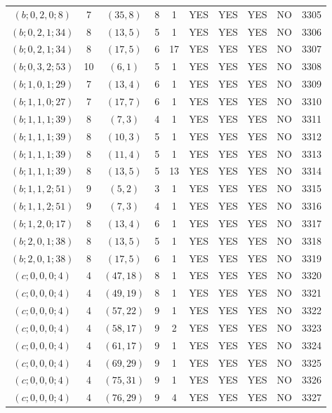 \begin{longtable}{|c|c|c|c|c|c|c|c|c|c|}
$(b; 0, 2, 0; 8)$ & 7 & $(35, 8)$ & 8 & 1 & YES & YES & YES & NO & 3305\\
$(b; 0, 2, 1; 34)$ & 8 & $(13, 5)$ & 5 & 1 & YES & YES & YES & NO & 3306\\
$(b; 0, 2, 1; 34)$ & 8 & $(17, 5)$ & 6 & 17 & YES & YES & YES & NO & 3307\\
$(b; 0, 3, 2; 53)$ & 10 & $(6, 1)$ & 5 & 1 & YES & YES & YES & NO & 3308\\
$(b; 1, 0, 1; 29)$ & 7 & $(13, 4)$ & 6 & 1 & YES & YES & YES & NO & 3309\\
$(b; 1, 1, 0; 27)$ & 7 & $(17, 7)$ & 6 & 1 & YES & YES & YES & NO & 3310\\
$(b; 1, 1, 1; 39)$ & 8 & $(7, 3)$ & 4 & 1 & YES & YES & YES & NO & 3311\\
$(b; 1, 1, 1; 39)$ & 8 & $(10, 3)$ & 5 & 1 & YES & YES & YES & NO & 3312\\
$(b; 1, 1, 1; 39)$ & 8 & $(11, 4)$ & 5 & 1 & YES & YES & YES & NO & 3313\\
$(b; 1, 1, 1; 39)$ & 8 & $(13, 5)$ & 5 & 13 & YES & YES & YES & NO & 3314\\
$(b; 1, 1, 2; 51)$ & 9 & $(5, 2)$ & 3 & 1 & YES & YES & YES & NO & 3315\\
$(b; 1, 1, 2; 51)$ & 9 & $(7, 3)$ & 4 & 1 & YES & YES & YES & NO & 3316\\
$(b; 1, 2, 0; 17)$ & 8 & $(13, 4)$ & 6 & 1 & YES & YES & YES & NO & 3317\\
$(b; 2, 0, 1; 38)$ & 8 & $(13, 5)$ & 5 & 1 & YES & YES & YES & NO & 3318\\
$(b; 2, 0, 1; 38)$ & 8 & $(17, 5)$ & 6 & 1 & YES & YES & YES & NO & 3319\\
$(c; 0, 0, 0; 4)$ & 4 & $(47, 18)$ & 8 & 1 & YES & YES & YES & NO & 3320\\
$(c; 0, 0, 0; 4)$ & 4 & $(49, 19)$ & 8 & 1 & YES & YES & YES & NO & 3321\\
$(c; 0, 0, 0; 4)$ & 4 & $(57, 22)$ & 9 & 1 & YES & YES & YES & NO & 3322\\
$(c; 0, 0, 0; 4)$ & 4 & $(58, 17)$ & 9 & 2 & YES & YES & YES & NO & 3323\\
$(c; 0, 0, 0; 4)$ & 4 & $(61, 17)$ & 9 & 1 & YES & YES & YES & NO & 3324\\
$(c; 0, 0, 0; 4)$ & 4 & $(69, 29)$ & 9 & 1 & YES & YES & YES & NO & 3325\\
$(c; 0, 0, 0; 4)$ & 4 & $(75, 31)$ & 9 & 1 & YES & YES & YES & NO & 3326\\
$(c; 0, 0, 0; 4)$ & 4 & $(76, 29)$ & 9 & 4 & YES & YES & YES & NO & 3327\\

\end{longtable}
